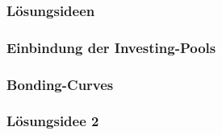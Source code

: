 \newpage
\subsubsection{Lösungsideen}
\vspace{0.3cm}
\subsubsection{Einbindung der Investing-Pools}
\vspace{0.3cm}
\subsubsection{Bonding-Curves}
\vspace{0.3cm}
\newpage



\subsubsection{Lösungsidee 2}
\vspace{0.3cm}

